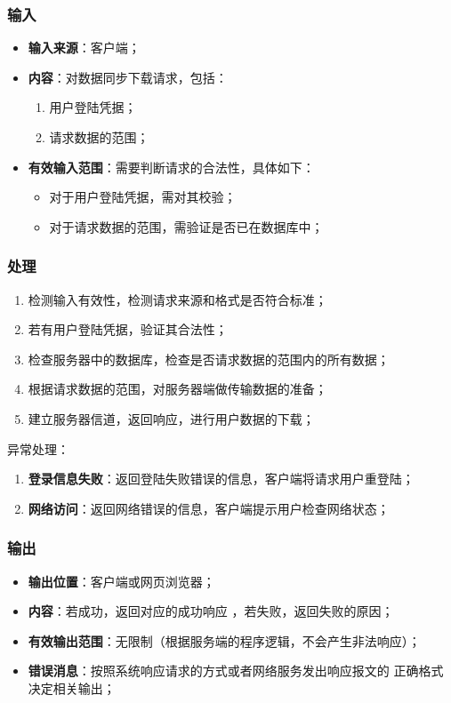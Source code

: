 \subsubsection{输入}
	\begin{itemize}
		\item \textbf{输入来源}：客户端；
		\item \textbf{内容}：对数据同步下载请求，包括：
		\begin{enumerate}
			\item 用户登陆凭据；
			\item 请求数据的范围；
		\end{enumerate}
		\item \textbf{有效输入范围}：需要判断请求的合法性，具体如下：
		\begin{itemize}
			\item 对于用户登陆凭据，需对其校验； 
			\item 对于请求数据的范围，需验证是否已在数据库中； 
		\end{itemize}
	\end{itemize}
\subsubsection{处理}
	\begin{enumerate}
		\item 检测输入有效性，检测请求来源和格式是否符合标准；
		\item 若有用户登陆凭据，验证其合法性；
		\item 检查服务器中的数据库，检查是否请求数据的范围内的所有数据；
		\item 根据请求数据的范围，对服务器端做传输数据的准备；
		\item 建立服务器信道，返回响应，进行用户数据的下载；
	\end{enumerate}
	\noindent 异常处理：
	\begin{enumerate}
		\item \textbf{登录信息失败}：返回登陆失败错误的信息，客户端将请求用户重登陆；
		\item \textbf{网络访问}：返回网络错误的信息，客户端提示用户检查网络状态；
	\end{enumerate}
\subsubsection{输出}
\begin{itemize}
	\item \textbf{输出位置}：客户端或网页浏览器；
	\item \textbf{内容}：若成功，返回对应的成功响应 ，若失败，返回失败的原因；
	\item \textbf{有效输出范围}：无限制（根据服务端的程序逻辑，不会产生非法响应）；
	\item \textbf{错误消息}：按照系统响应请求的方式或者网络服务发出响应报文的
		正确格式决定相关输出；
\end{itemize}

